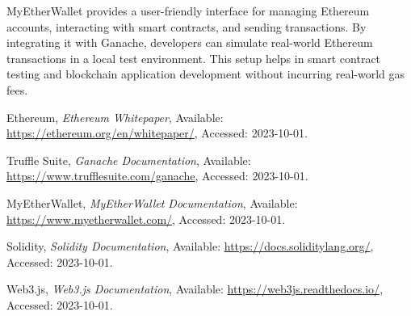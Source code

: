 \documentclass[11pt]{article}
\begin{document}
MyEtherWallet provides a user-friendly interface for managing Ethereum accounts, interacting with smart contracts, and sending transactions. By integrating it with Ganache, developers can simulate real-world Ethereum transactions in a local test environment. This setup helps in smart contract testing and blockchain application development without incurring real-world gas fees.




\clearpage
\begin{thebibliography}{99}
Ethereum, \emph{Ethereum Whitepaper}, Available: \url{https://ethereum.org/en/whitepaper/}, Accessed: 2023-10-01.

Truffle Suite, \emph{Ganache Documentation}, Available: \url{https://www.trufflesuite.com/ganache}, Accessed: 2023-10-01.

MyEtherWallet, \emph{MyEtherWallet Documentation}, Available: \url{https://www.myetherwallet.com/}, Accessed: 2023-10-01.

Solidity, \emph{Solidity Documentation}, Available: \url{https://docs.soliditylang.org/}, Accessed: 2023-10-01.

Web3.js, \emph{Web3.js Documentation}, Available: \url{https://web3js.readthedocs.io/}, Accessed: 2023-10-01.
\end{thebibliography}
\end{document}
